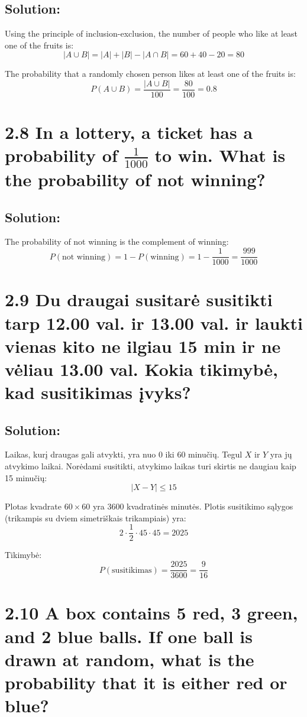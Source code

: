\documentclass{article}
\begin{document}
{\subsection*{Solution:}
Using the principle of inclusion-exclusion, the number of people who like at least one of the fruits is:
\[
|A \cup B| = |A| + |B| - |A \cap B| = 60 + 40 - 20 = 80
\]

The probability that a randomly chosen person likes at least one of the fruits is:
\[
P(A \cup B) = \frac{|A \cup B|}{100} = \frac{80}{100} = 0.8
\]

\section*{2.8 In a lottery, a ticket has a probability of \(\frac{1}{1000}\) to win. What is the probability of not winning?}

\subsection*{Solution:}
The probability of not winning is the complement of winning:
\[
P(\text{not winning}) = 1 - P(\text{winning}) = 1 - \frac{1}{1000} = \frac{999}{1000}
\]

\section*{2.9 Du draugai susitarė susitikti tarp 12.00 val. ir 13.00 val. ir laukti vienas kito ne ilgiau 15 min ir ne vėliau 13.00 val. Kokia tikimybė, kad susitikimas įvyks?}

\subsection*{Solution:}
Laikas, kurį draugas gali atvykti, yra nuo 0 iki 60 minučių. Tegul \(X\) ir \(Y\) yra jų atvykimo laikai. Norėdami susitikti, atvykimo laikas turi skirtis ne daugiau kaip 15 minučių:
\[
|X - Y| \leq 15
\]

Plotas kvadrate \(60 \times 60\) yra 3600 kvadratinės minutės. Plotis susitikimo sąlygos (trikampis su dviem simetriškais trikampiais) yra:
\[
2 \cdot \frac{1}{2} \cdot 45 \cdot 45 = 2025
\]

Tikimybė:
\[
P(\text{susitikimas}) = \frac{2025}{3600} = \frac{9}{16}
\]

\section*{2.10 A box contains 5 red, 3 green, and 2 blue balls. If one ball is drawn at random, what is the probability that it is either red or blue?}

}
\end{document}
